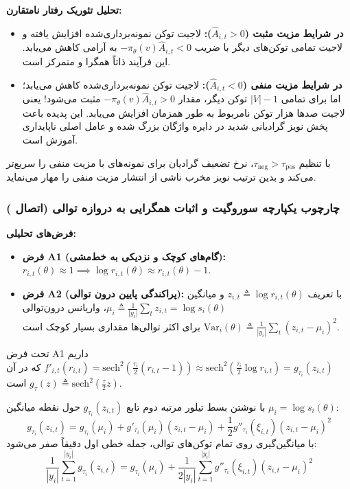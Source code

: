 \textbf{تحلیل تئوریک رفتار نامتقارن:}
\begin{itemize}
	\item \textbf{در شرایط مزیت مثبت ($\hat{A}_{i,t} > 0$):} لاجیت توکن نمونه‌برداری‌شده افزایش یافته و لاجیت تمامی توکن‌های دیگر با ضریب $-\pi_\theta(v)\hat{A}_{i,t} < 0$ به آرامی کاهش می‌یابد. این فرآیند ذاتاً همگرا و متمرکز است.
	\item \textbf{در شرایط مزیت منفی ($\hat{A}_{i,t} < 0$):} لاجیت توکن نمونه‌برداری‌شده کاهش می‌یابد؛ اما برای تمامی $|V|-1$ توکن دیگر، مقدار $-\pi_\theta(v)\hat{A}_{i,t} > 0$ مثبت می‌شود! یعنی لاجیت صدها هزار توکن نامربوط به طور همزمان افزایش می‌یابد. این پدیده باعث پخش نویز گرادیانی شدید در دایره واژگان بزرگ شده و عامل اصلی ناپایداری آموزش است.
\end{itemize}

 با تنظیم $\tau_{\text{neg}} > \tau_{\text{pos}}$، نرخ تضعیف گرادیان برای نمونه‌های با مزیت منفی را سریع‌تر می‌کند و بدین ترتیب نویز مخرب ناشی از انتشار مزیت منفی را مهار می‌نماید.

\subsubsection*{چارچوب یکپارچه سوروگیت و اثبات همگرایی به دروازه توالی (اتصال )}

\textbf{فرض‌های تحلیلی:}
\begin{itemize}
	\item \textbf{فرض A1 (گام‌های کوچک و نزدیکی به خط‌مشی):} $r_{i,t}(\theta) \approx 1 \implies \log r_{i,t}(\theta) \approx r_{i,t}(\theta) - 1$.
	\item \textbf{فرض A2 (پراکندگی پایین درون توالی):} با تعریف $z_{i,t} \triangleq \log r_{i,t}(\theta)$ و میانگین $\mu_i \triangleq \frac{1}{|y_i|} \sum_t z_{i,t} = \log s_i(\theta)$، واریانس درون‌توالی $\text{Var}_i(\theta) \triangleq \frac{1}{|y_i|}\sum_t (z_{i,t}-\mu_i)^2$ برای اکثر توالی‌ها مقداری بسیار کوچک است.
\end{itemize}

تحت فرض A1 داریم $f'_{i,t}(r_{i,t}) = \text{sech}^2\left(\frac{\tau_i}{2}(r_{i,t}-1)\right) \approx \text{sech}^2\left(\frac{\tau_i}{2} \log r_{i,t}\right) = g_{\tau_i}(z_{i,t})$ که در آن $g_\tau(z) \triangleq \text{sech}^2(\frac{\tau}{2}z)$ است.

با نوشتن بسط تیلور مرتبه دوم تابع $g_{\tau_i}(z_{i,t})$ حول نقطه میانگین $\mu_i = \log s_i(\theta)$:
\begin{equation}
	\label{eq:taylor_expansion}
	g_{\tau_i}(z_{i,t}) = g_{\tau_i}(\mu_i) + g'_{\tau_i}(\mu_i)(z_{i,t} - \mu_i) + \frac{1}{2} g''_{\tau_i}(\xi_{i,t})(z_{i,t} - \mu_i)^2
\end{equation}
با میانگین‌گیری روی تمام توکن‌های توالی، جمله خطی اول دقیقاً صفر می‌شود:
\begin{equation}
	\label{eq:taylor_mean}
	\frac{1}{|y_i|} \sum_{t=1}^{|y_i|} g_{\tau_i}(z_{i,t}) = g_{\tau_i}(\mu_i) + \frac{1}{2|y_i|} \sum_{t=1}^{|y_i|} g''_{\tau_i}(\xi_{i,t})(z_{i,t} - \mu_i)^2
\end{equation}

